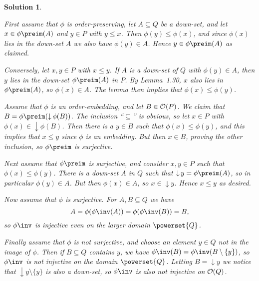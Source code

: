 \documentclass[article, a4paper, 11pt, oneside]{memoir}
\numberwithin{equation}{chapter}
\theoremstyle{nonumberplain}
\newtheorem{solution}{Solution}
\newcommand{\downset}{\operatorname{\downarrow}}
\begin{document}
\begin{solution}
\begin{solutionsec}
    \item First assume that $\phi$ is order-preserving, let $A \subseteq Q$ be a down-set, and let $x \in \phi\preim(A)$ and $y \in P$ with $y \leq x$. Then $\phi(y) \leq \phi(x)$, and since $\phi(x)$ lies in the down-set $A$ we also have $\phi(y) \in A$. Hence $y \in \phi\preim(A)$ as claimed.

    Conversely, let $x,y \in P$ with $x \leq y$. If $A$ is a down-set of $Q$ with $\phi(y) \in A$, then $y$ lies in the down-set $\phi\preim(A)$ in $P$. By Lemma~1.30, $x$ also lies in $\phi\preim(A)$, so $\phi(x) \in A$. The lemma then implies that $\phi(x) \leq \phi(y)$.

    \item Assume that $\phi$ is an order-embedding, and let $B \in \mathcal{O}(P)$. We claim that $B = \phi\preim(\downset \phi(B))$. The inclusion \enquote{$\subseteq$} is obvious, so let $x \in P$ with $\phi(x) \in \downset \phi(B)$. Then there is a $y \in B$ such that $\phi(x) \leq \phi(y)$, and this implies that $x \leq y$ since $\phi$ is an embedding. But then $x \in B$, proving the other inclusion, so $\phi\preim$ is surjective.
    
    Next assume that $\phi\preim$ is surjective, and consider $x,y \in P$ such that $\phi(x) \leq \phi(y)$. There is a down-set $A$ in $Q$ such that $\downset y = \phi\preim(A)$, so in particular $\phi(y) \in A$. But then $\phi(x) \in A$, so $x \in \downset y$. Hence $x \leq y$ as desired.

    Now assume that $\phi$ is surjective. For $A,B \subseteq Q$ we have
    \begin{equation*}
        A
            = \phi(\phi\inv(A))
            = \phi(\phi\inv(B))
            = B,
    \end{equation*}
    so $\phi\inv$ is injective even on the larger domain $\powerset{Q}$.

    Finally assume that $\phi$ is \emph{not} surjective, and choose an element $y \in Q$ not in the image of $\phi$. Then if $B \subseteq Q$ contains $y$, we have $\phi\inv(B) = \phi\inv(B \setminus \{y\})$, so $\phi\inv$ is not injective on the domain $\powerset{Q}$. Letting $B = \downset y$ we notice that $\downset y \setminus \{y\}$ is also a down-set, so $\phi\inv$ is also not injective on $\mathcal{O}(Q)$.
\end{solutionsec}
\end{solution}
\end{document}
